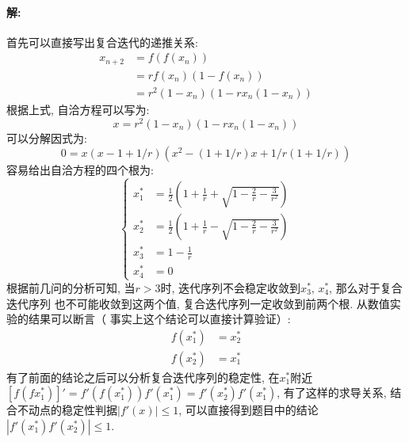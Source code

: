 \documentclass[a4paper,zihao=5,UTF8]{ctexart}
\begin{document}
    \paragraph{解:}
    首先可以直接写出复合迭代的递推关系:
    \begin{equation}
        \begin{aligned}
            x_{n+2} &= f(f(x_n))\\
            & = rf(x_n)(1 - f(x_n))\\
            & = r^2(1 - x_n)(1 - rx_n(1 - x_n))
        \end{aligned}
    \end{equation}
    根据上式, 自洽方程可以写为:
    \begin{equation}
        x = r^2(1 - x_n)(1 - rx_n(1 - x_n))
    \end{equation}
    可以分解因式为:
    \begin{equation}
        0 = x(x - 1 + 1/r)(x^2 - (1 + 1/r)x + 1/r(1+1/r))
    \end{equation}
    容易给出自洽方程的四个根为:
    \begin{equation}
        \left\{
            \begin{aligned}
                x_1^* &= \frac{1}{2}\left(1 + \frac{1}{r} + \sqrt{1 - \frac{2}{r} - \frac{3}{r^2}}\right)\\
                x_2^* &= \frac{1}{2}\left(1 + \frac{1}{r} - \sqrt{1 - \frac{2}{r} - \frac{3}{r^2}}\right)\\
                x_3^* &= 1 - \frac{1}{r}\\
                x_4^* &= 0
            \end{aligned}
        \right.
    \end{equation}
    根据前几问的分析可知, 当$r > 3$时, 迭代序列不会稳定收敛到$x_3^*,\,x_4^*$, 那么对于复合迭代序列
    也不可能收敛到这两个值, 复合迭代序列一定收敛到前两个根. 从数值实验的结果可以断言（
    事实上这个结论可以直接计算验证）:
    \begin{equation}
        \begin{aligned}
            f(x_1^*) &= x_2^*\\
            f(x_2^*) &= x_1^*
        \end{aligned}
    \end{equation}
    有了前面的结论之后可以分析复合迭代序列的稳定性, 在$x_1^*$附近$[f(fx_1^*)]' = f'(f(x_1^*))f'(x_1^*) = f'(x_2^*)f'(x_1^*)$, 
    有了这样的求导关系, 结合不动点的稳定性判据$|f'(x)| \leq 1$, 可以直接得到题目中的结论$|f'(x_1^*)f'(x_2^*)| \leq 1$.
\end{document}
